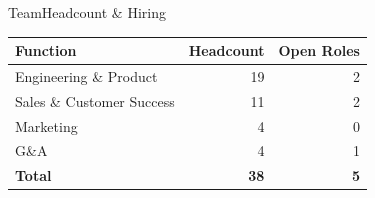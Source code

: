 \begin{frame}{Team}{Headcount \& Hiring}

  \centering
  {\small{}
  \renewcommand{\arraystretch}{1.1}
  \begin{tabular}{l r r}
    \toprule
    \rowcolor{panelBg}
    \textcolor{textLight}{\textbf{Function}} & \textcolor{textLight}{\textbf{Headcount}} & \textcolor{accent}{\textbf{Open Roles}} \\
    \midrule
    Engineering \& Product     & 19 & 2 \\
    \rowcolor{panelBg}
    Sales \& Customer Success  & 11 & 2 \\
    Marketing                  & 4  & 0 \\
    \rowcolor{panelBg}
    G\&A                       & 4  & 1 \\
    \midrule
    \textbf{Total}             & \textbf{38} & \textbf{5} \\
    \bottomrule
  \end{tabular}}

  \vspace{0.2cm}
  \begin{minipage}{0.31\textwidth}\centering
    \begin{statcard}
    \end{statcard}
  \end{minipage}\hfill
  \begin{minipage}{0.31\textwidth}\centering
    \begin{statcard}
    \end{statcard}
  \end{minipage}\hfill
  \begin{minipage}{0.31\textwidth}\centering
    \begin{statcard}
    \end{statcard}
  \end{minipage}
  \par

\end{frame}
